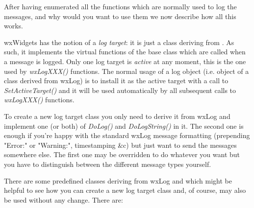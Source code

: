After having enumerated all the functions which are normally used to log the
messages, and why would you want to use them we now describe how all this
works.

wxWidgets has the notion of a {\it log target}: it is just a class deriving
from . As such, it implements the virtual functions of
the base class which are called when a message is logged. Only one log target
is {\it active} at any moment, this is the one used by {\it wxLogXXX()}
functions. The normal usage of a log object (i.e. object of a class derived
from wxLog) is to install it as the active target with a call to {\it
SetActiveTarget()} and it will be used automatically by all subsequent calls
to {\it wxLogXXX()} functions.

To create a new log target class you only need to derive it from wxLog and
implement one (or both) of {\it DoLog()} and {\it DoLogString()} in it. The
second one is enough if you're happy with the standard wxLog message
formatting (prepending "Error:" or "Warning:", timestamping \&c) but just want
to send the messages somewhere else. The first one may be overridden to do
whatever you want but you have to distinguish between the different message
types yourself.

There are some predefined classes deriving from wxLog and which might be
helpful to see how you can create a new log target class and, of course, may
also be used without any change. There are:


